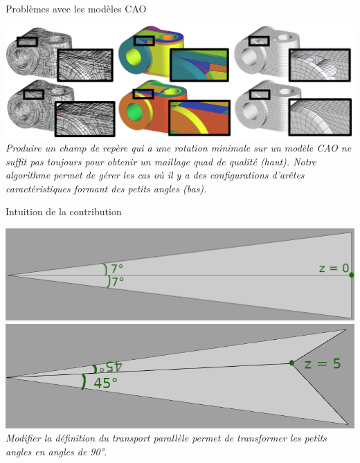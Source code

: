 \begin{frame}{Problèmes avec les modèles CAO}
    \begin{center}
        \includegraphics[width=0.9\linewidth]{img/cadff/teaser2}
        \small{
            \textit{Produire un champ de repère qui a une rotation minimale sur un modèle CAO ne suffit pas toujours pour obtenir un maillage quad de qualité (haut). 
            Notre algorithme permet de gérer les cas où il y a des configurations d'arêtes caractéristiques formant des petits angles (bas).}
        }
    \end{center}
\end{frame}
    
\begin{frame}{Intuition de la contribution}
    \begin{center}
        \includegraphics[width=0.9\linewidth]{img/new_images/flat_tri_annot.png}
        \includegraphics[width=0.9\linewidth]{img/new_images/surface_tri_annot.png}
        \small{
            \textit{Modifier la définition du transport parallèle permet de transformer les petits angles en angles de 90°.}
        }
    \end{center}
\end{frame}

